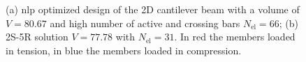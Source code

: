 \begin{figure}
    \centering
    \hspace*{\fill}
    \hfill
    \hspace*{\fill}
    \caption{(a) \gls{nlp} optimized design of the 2D cantilever beam with a volume of $V=80.67$ and high number of active and crossing bars $N_{\text{el}}=66$; (b) 2S-5R solution $V=77.78$ with $N_{\text{el}}=31$. In red the members loaded in tension, in blue the members loaded in compression.}
    \label{fig:04_2d_cant_sol}
\end{figure}

